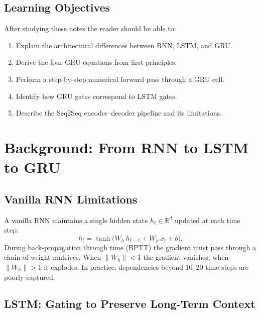 \documentclass[12pt,a4paper]{article}
\begin{document}
\subsection{Learning Objectives}

After studying these notes the reader should be able to:
\begin{enumerate}[label=\arabic*.]
  \item Explain the architectural differences between RNN, LSTM, and GRU.
  \item Derive the four GRU equations from first principles.
  \item Perform a step-by-step numerical forward pass through a GRU cell.
  \item Identify how GRU gates correspond to LSTM gates.
  \item Describe the Seq2Seq encoder--decoder pipeline and its limitations.
\end{enumerate}

\section{Background: From RNN to LSTM to GRU}
\label{sec:background}

\subsection{Vanilla RNN Limitations}

A vanilla RNN maintains a single hidden state $h_t \in \mathbb{R}^d$ updated at each time step:
\begin{equation}
  h_t = \tanh\!\bigl(W_h\,h_{t-1} + W_x\,x_t + b\bigr).
  \label{eq:rnn}
\end{equation}
During back-propagation through time (BPTT) the gradient must pass through a chain of weight matrices.
When $\|W_h\| < 1$ the gradient vanishes; when $\|W_h\| > 1$ it explodes. In practice, dependencies
beyond 10--20 time steps are poorly captured.

\subsection{LSTM: Gating to Preserve Long-Term Context}
\end{document}
